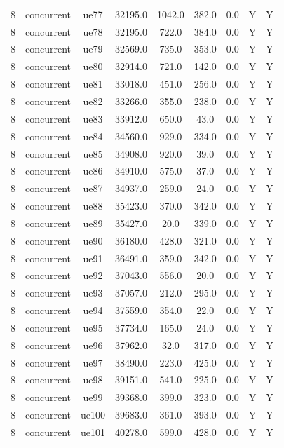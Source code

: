 \begin{table}[ht]
\begin{tabular}{|c|c|c|c|c|c|c|c|c|}
8 & concurrent & ue77 & 32195.0 & 1042.0 & 382.0 & 0.0 & Y & Y \\
8 & concurrent & ue78 & 32195.0 & 722.0 & 384.0 & 0.0 & Y & Y \\
8 & concurrent & ue79 & 32569.0 & 735.0 & 353.0 & 0.0 & Y & Y \\
8 & concurrent & ue80 & 32914.0 & 721.0 & 142.0 & 0.0 & Y & Y \\
8 & concurrent & ue81 & 33018.0 & 451.0 & 256.0 & 0.0 & Y & Y \\
8 & concurrent & ue82 & 33266.0 & 355.0 & 238.0 & 0.0 & Y & Y \\
8 & concurrent & ue83 & 33912.0 & 650.0 & 43.0 & 0.0 & Y & Y \\
8 & concurrent & ue84 & 34560.0 & 929.0 & 334.0 & 0.0 & Y & Y \\
8 & concurrent & ue85 & 34908.0 & 920.0 & 39.0 & 0.0 & Y & Y \\
8 & concurrent & ue86 & 34910.0 & 575.0 & 37.0 & 0.0 & Y & Y \\
8 & concurrent & ue87 & 34937.0 & 259.0 & 24.0 & 0.0 & Y & Y \\
8 & concurrent & ue88 & 35423.0 & 370.0 & 342.0 & 0.0 & Y & Y \\
8 & concurrent & ue89 & 35427.0 & 20.0 & 339.0 & 0.0 & Y & Y \\
8 & concurrent & ue90 & 36180.0 & 428.0 & 321.0 & 0.0 & Y & Y \\
8 & concurrent & ue91 & 36491.0 & 359.0 & 342.0 & 0.0 & Y & Y \\
8 & concurrent & ue92 & 37043.0 & 556.0 & 20.0 & 0.0 & Y & Y \\
8 & concurrent & ue93 & 37057.0 & 212.0 & 295.0 & 0.0 & Y & Y \\
8 & concurrent & ue94 & 37559.0 & 354.0 & 22.0 & 0.0 & Y & Y \\
8 & concurrent & ue95 & 37734.0 & 165.0 & 24.0 & 0.0 & Y & Y \\
8 & concurrent & ue96 & 37962.0 & 32.0 & 317.0 & 0.0 & Y & Y \\
8 & concurrent & ue97 & 38490.0 & 223.0 & 425.0 & 0.0 & Y & Y \\
8 & concurrent & ue98 & 39151.0 & 541.0 & 225.0 & 0.0 & Y & Y \\
8 & concurrent & ue99 & 39368.0 & 399.0 & 323.0 & 0.0 & Y & Y \\
8 & concurrent & ue100 & 39683.0 & 361.0 & 393.0 & 0.0 & Y & Y \\
8 & concurrent & ue101 & 40278.0 & 599.0 & 428.0 & 0.0 & Y & Y \\

\end{tabular}
\end{table}
